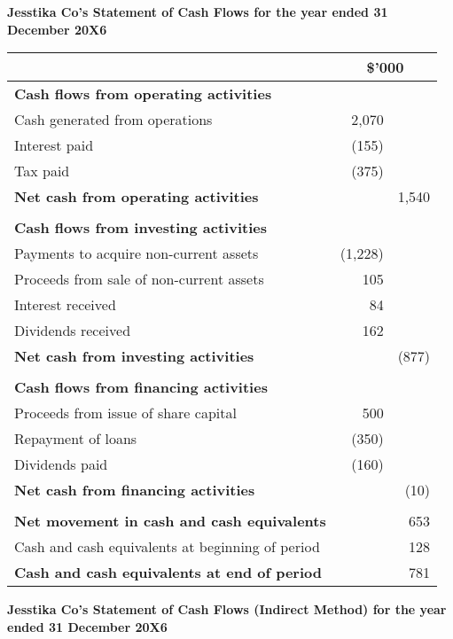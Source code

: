 \newpage

\begin{center}
\textbf{Jesstika Co's Statement of Cash Flows for the year ended 31 December 20X6}


\begin{tabular}{@{}l r r@{}}
\toprule
 & \multicolumn{2}{c}{\$'000} \\
\midrule
\textbf{Cash flows from operating activities} & & \\
\quad Cash generated from operations & 2,070 & \\
\quad Interest paid & (155) & \\
\quad Tax paid & (375) & \\
\textbf{Net cash from operating activities} & & 1,540 \\
\\
\textbf{Cash flows from investing activities} & & \\
\quad Payments to acquire non-current assets & (1,228) & \\
\quad Proceeds from sale of non-current assets & 105 & \\
\quad Interest received & 84 & \\
\quad Dividends received & 162 & \\
\textbf{Net cash from investing activities} & & (877) \\
\\
\textbf{Cash flows from financing activities} & & \\
\quad Proceeds from issue of share capital & 500 & \\
\quad Repayment of loans & (350) & \\
\quad Dividends paid & (160) & \\
\textbf{Net cash from financing activities} & & (10) \\
\\
\textbf{Net movement in cash and cash equivalents} & & 653 \\
Cash and cash equivalents at beginning of period & & 128 \\
\textbf{Cash and cash equivalents at end of period} & & 781 \\
\bottomrule
\end{tabular}

\end{center}



\begin{center}
\textbf{Jesstika Co's Statement of Cash Flows (Indirect Method) for the year ended 31 December 20X6}
\end{center}

